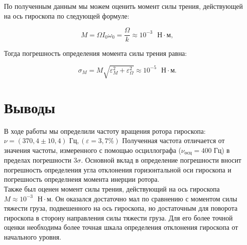 По полученным данным мы можем оценить момент силы трения, действующей на ось гироскопа по следующей формуле:

\[
M = \Omega I_0\omega_0 = \frac{\Omega}{k} \approx 10^{-3} \text{ } \text{Н} \cdot \text{м},
\]


    Тогда погрешность определения момента силы трения равна:

\[
\sigma_M = M\sqrt{\varepsilon_M^2+\varepsilon_\Omega^2} \approx 10^{-5} \text{ } \text{Н} \cdot \text{м}.
\]












\section{Выводы}

В ходе работы мы определили частоту вращения ротора гироскопа:$ \nu = \left( 370,4 \pm 10,4 \right) \text{ Гц}, \left( \varepsilon = 3,7 \% \right)   $
Полученная частота отличается от значения частоты, измеренного с помощью осциллографа ($ \nu_\text{осц} = 400 $ Гц) в пределах погрешности 3$\sigma$. Основной вклад в определение погрешности вносит погрешность определения угла отклонения горизонтальной оси гироскопа и погрешность определнеия момента инерции ротора.\\

Также был оценен момент силы трения, действующий на ось гироскопа $ M \approx 10^{-3} \text{ } \text{Н} \cdot \text{м} $. Он оказался достаточно мал по сравнению с моментом силы тяжести груза, подвешенного на ось гироскопа, но достаточным для поворота гироскопа в сторону направления силы тяжести груза. Для его более точной оценки необходима более точная шкала определения отклонения гироскопа от начального уровня.



















